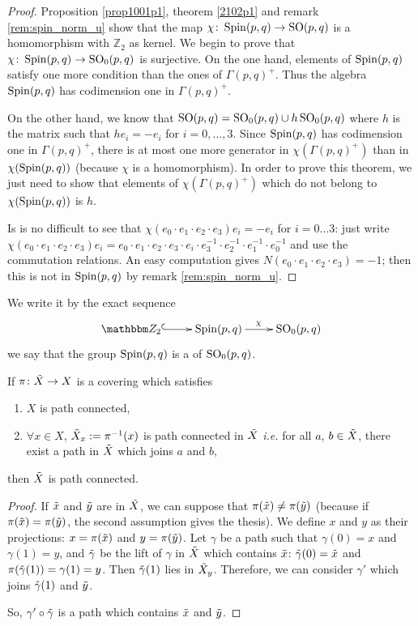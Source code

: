 \begin{proof}
Proposition \ref{prop1001p1}, theorem \ref{2102p1} and remark \ref{rem:spin_norm_u} show that the map $\chi\colon \operatorname{Spin}(p,q)\to \operatorname{SO}(p,q)$ is a homomorphism with $\mathbb{Z}_2$ as kernel. We begin to prove that $\chi\colon \operatorname{Spin}(p,q)\to \operatorname{SO}_0(p,q)$ is surjective. On the one hand, elements of $\operatorname{Spin}(p,q)$ satisfy one more condition than the ones of $\Gamma(p,q)^+$. Thus the algebra $\operatorname{Spin}(p,q)$ has codimension one in $\Gamma(p,q)^+$.

On the other hand, we know that $\operatorname{SO}(p,q)=\operatorname{SO}_0(p,q)\cup h\operatorname{SO}_0(p,q)$ where $h$ is the matrix such that $he_i=-e_i$ for $i=0,\ldots,3$. Since $\operatorname{Spin}(p,q)$ has codimension one in $\Gamma(p,q)^+$, there is at most one more generator in $\chi(\Gamma(p,q)^+)$ than in $\chi(\operatorname{Spin}(p,q))$ (because $\chi$ is a homomorphism). In order to prove this theorem, we just need to show that elements of $\chi(\Gamma(p,q)^+)$ which do not belong to $\chi(\operatorname{Spin}(p,q))$ is $h$.

Is is no difficult to see that $\chi(e_0\cdot e_1\cdot e_2\cdot e_3)e_i=-e_i$ for $i=0\ldots 3$: just write
$\chi(e_0\cdot e_1\cdot e_2\cdot e_3)e_i=e_0\cdot e_1\cdot e_2\cdot e_3\cdot e_i\cdot e_3^{-1}\cdot e_2^{-1}\cdot e_1^{-1}\cdot e_0^{-1}$ and use the commutation relations. An easy computation gives
$N(e_0\cdot e_1\cdot e_2\cdot e_3)=-1$; then this is not in $\operatorname{Spin}(p,q)$ by remark \ref{rem:spin_norm_u}.
\end{proof}

We write it by the exact sequence
\begin{equation}
 \xymatrix{
    \eZ_2  \ar@{^{(}->}[r] & \Sppq \ar[r]^{\chi} & \SO_0(p,q)
  } 
\end{equation}
we say that the group $\operatorname{Spin}(p,q)$ is a  of $\operatorname{SO}_0(p,q)$.

\begin{lemma}
If $\pi\colon \tilde{X}\to X$ is a covering which satisfies

\begin{enumerate}
\item $X$ is path connected,
\item $\forall x\in X$, $\tilde{X}_x:=\pi^{-1}(x)$ is path connected in $\tilde{X}$ \emph{i.e.} for all $a$, $b\in \tilde{X}$, there exist a path in $\tilde{X}$ which joins $a$ and $b$,
\end{enumerate}
then $\tilde{X}$ is path connected.
\label{lem_cov_path_con}
\end{lemma}
\begin{proof}
If $\tilde{x}$ and $\tilde{y}$ are in $\tilde{X}$, we can suppose that $\pi(\tilde{x})\neq\pi(\tilde{y})$ (because if $\pi(\tilde{x})=\pi(\tilde{y})$, the second assumption gives the thesis). We define $x$ and $y$ as their projections: $x=\pi(\tilde{x})$ and $y=\pi(\tilde{y})$. Let $\gamma$ be a path such that $\gamma(0)=x$ and $\gamma(1)=y$, and $\tilde{\gamma}$ be the lift of $\gamma$ in $\tilde{X}$ which contains $\tilde{x}$: $\tilde{\gamma}(0)=\tilde{x}$ and $\pi(\tilde{\gamma}(1))=\gamma(1)=y$. Then $\tilde{\gamma}(1)$ lies in $\tilde{X}_y$. Therefore, we can consider $\gamma'$ which joins $\tilde{\gamma}(1)$ and $\tilde{y}$.

So, $\gamma'\circ\tilde{\gamma}$ is a path which contains $\tilde{x}$ and $\tilde{y}$.
\end{proof}


